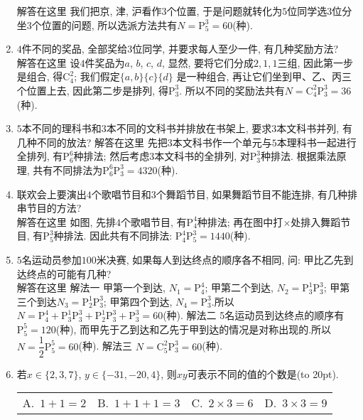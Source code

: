 \documentclass[10pt,a4paper]{article}
\newcommand{\bracket}[1]{(\hbox to #1pt{})}
\newcommand{\fourch}[4]{\par\begin{tabular}{p{.23\textwidth}p{.23\textwidth}p{.23\textwidth}p{.23\textwidth}}
A.~#1 &B.~#2& C.~#3& D.~#4
\end{tabular}}
\begin{document}
\begin{enumerate}[1.]
解答在这里  我们把京, 津, 沪看作$3$个位置, 于是问题就转化为$5$位同学选$3$位分坐$3$个位置的问题, 所以选派方法共有$N=\mathrm{P}_5^3=60$(种).
\item $4$件不同的奖品, 全部奖给$3$位同学, 并要求每人至少一件, 有几种奖励方法?\\
解答在这里 设$4$件奖品为$a$, $b$, $c$, $d$, 显然, 要将它们分成$2, 1, 1$三组, 因此第一步是组合, 得$\mathrm{C}_4^2$; 我们假定$\{a,b\}\{c\}\{d\}$ 是一种组合, 再让它们坐到甲、乙、丙三个位置上去, 因此第二步是排列, 得$\mathrm{P}_3^3$.
所以不同的奖励法共有$N=\mathrm{C}_4^2\mathrm{P}_3^3=36$(种).
\item $5$本不同的理科书和$3$本不同的文科书并排放在书架上, 要求$3$本文科书并列, 有几种不同的放法?
解答在这里  先把$3$本文科书作一个单元与$5$本理科书一起进行全排列, 有$\mathrm{P}_6^6$种排法; 然后考虑$3$本文科书的全排列, 对$\mathrm{P}_3^3$种排法.
根据乘法原理, 共有不同排法为$\mathrm{P}_6^6\mathrm{P}_3^3=4320$(种).
\item 联欢会上要演出$4$个歌唱节目和$3$个舞蹈节目, 如果舞蹈节目不能连排, 有几种排串节目的方法?\\
解答在这里  如图, 先排$4$个歌唱节目, 有$\mathrm{P}_4^4$种排法; 再在图中打$\times$处排入舞蹈节目, 有$\mathrm{P}_5^3$种排法. 因此共有不同排法: $\mathrm{P}_4^4\mathrm{P}_5^3=1440$(种).
\begin{center}
\end{center}
\item $5$名运动员参加$100$米决赛, 如果每人到达终点的顺序各不相同, 问: 甲比乙先到达终点的可能有几种?\\
解答在这里 解法一  甲第一个到达, $N_1=\mathrm{P}_4^4$; 甲第二个到达, $N_2=\mathrm{P}_3^1\mathrm{P}_3^3$; 甲第三个到达$N_3=\mathrm{P}_2^1\mathrm{P}_3^3$; 甲第四个到达, $N_4=\mathrm{P}_3^3$.所以$N=\mathrm{P}_4^4+\mathrm{P}_3^1\mathrm{P}_3^3+\mathrm{P}_2^1\mathrm{P}_3^3+\mathrm{P}_3^3=60$(种).
解法二  5名运动员到达终点的顺序有$\mathrm{P}_5^5=120$(种), 而甲先于乙到达和乙先于甲到达的情况是对称出现的.所以$N=\dfrac 12\mathrm{P}_5^5=60$(种).
解法三  $N=\mathrm{C}_5^2\mathrm{P}_3^3=60$(种).
\item 若$x\in \{2,3,7\}$, $y\in \{-31,-20,4\}$, 则$xy$可表示不同的值的个数是\bracket{20}.
\fourch{$1+1=2$}{$1+1+1=3$}{$2\times 3=6$}{$3\times 3=9$}

\end{enumerate}
\end{document}
